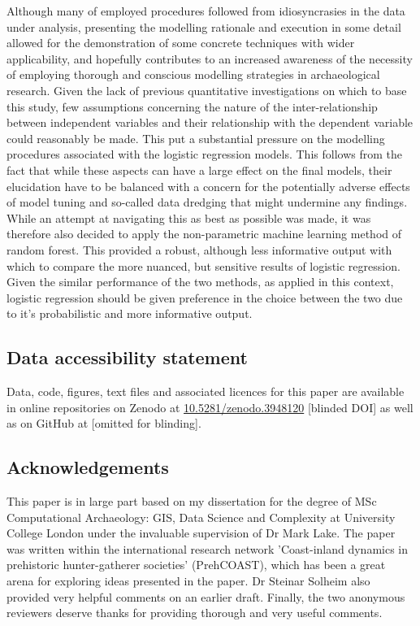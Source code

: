 \documentclass[12pt, a4paper]{article}
\begin{document}
Although many of employed procedures followed from idiosyncrasies in the data under analysis, presenting the modelling rationale and execution in some detail allowed for the demonstration of some concrete techniques with wider applicability, and hopefully contributes to an increased awareness of the necessity of employing thorough and conscious modelling strategies in archaeological research. Given the lack of previous quantitative investigations on which to base this study, few assumptions concerning the nature of the inter-relationship between independent variables and their relationship with the dependent variable could reasonably be made. This put a substantial pressure on the modelling procedures associated with the logistic regression models. This follows from the fact that while these aspects can have a large effect on the final models, their elucidation have to be balanced with a concern for the potentially adverse effects of model tuning and so-called data dredging that might undermine any findings. While an attempt at navigating this as best as possible was made, it was therefore also decided to apply the non-parametric machine learning method of random forest. This provided a robust, although less informative output with which to compare the more nuanced, but sensitive results of logistic regression. Given the similar performance of the two methods, as applied in this context, logistic regression should be given preference in the choice between the two due to it's probabilistic and more informative output.\par

\subsection*{Data accessibility statement}
Data, code, figures, text files and associated licences for this paper are available in online repositories on Zenodo at \href{https://doi.org/10.5281/zenodo.3948120}{10.5281/zenodo.3948120} [blinded DOI] as well as on GitHub at [omitted for blinding]. 

\subsection*{Acknowledgements}
This paper is in large part based on my dissertation for the degree of MSc Computational Archaeology: GIS, Data Science and Complexity at University College London under the invaluable supervision of Dr Mark Lake. The paper was written within the international research network 'Coast-inland dynamics in prehistoric hunter-gatherer societies' (PrehCOAST), which has been a great arena for exploring ideas presented in the paper. Dr Steinar Solheim also provided very helpful comments on an earlier draft. Finally, the two anonymous reviewers deserve thanks for providing thorough and very useful comments.


\end{document}
